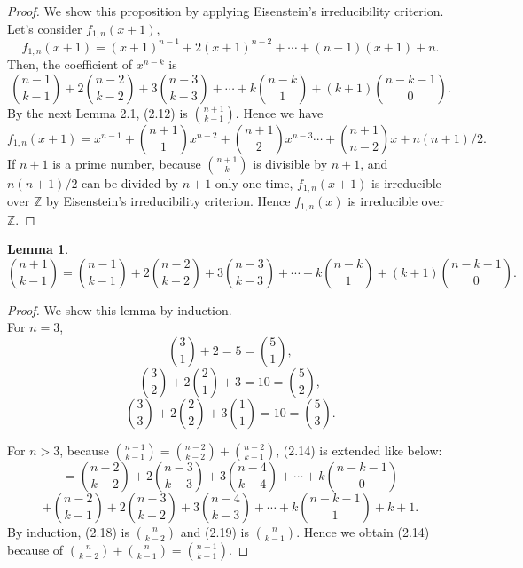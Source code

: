\documentclass{article}
\newtheorem{lemm}{Lemma}[section]
\begin{document}
\begin{proof}
We show this proposition by applying Eisenstein's irreducibility criterion. Let's consider $f_{1,n}(x+1)$,
\begin{equation}
f_{1,n}(x+1)=(x+1)^{n-1}+2(x+1)^{n-2}+\cdots +(n-1)(x+1)+n.
\end{equation}
Then, the coefficient of $x^{n-k}$ is
\begin{equation}
\binom{n-1}{k-1}+2\binom{n-2}{k-2}+3\binom{n-3}{k-3}+\cdots +k\binom{n-k}{1}+(k+1)\binom{n-k-1}{0}.
\end{equation}
By the next Lemma 2.1, (2.12) is $\binom{n+1}{k-1}$.  Hence we have
\begin{equation}
f_{1,n}(x+1)=x^{n-1}+\binom{n+1}{1}x^{n-2}+\binom{n+1}{2}x^{n-3}\cdots +\binom{n+1}{n-2}x+n(n+1)/2.
\end{equation}
If $n+1$ is a prime number, because $\binom{n+1}{k}$ is divisible by $n+1$, and $n(n+1)/2$ can be divided by $n+1$ only one time, $f_{1,n}(x+1)$ is irreducible over $\mathbb{Z}$ by Eisenstein's irreducibility criterion. Hence $f_{1,n}(x)$ is irreducible over $\mathbb{Z}$.
\end{proof}


\begin{lemm}
\upshape
\begin{equation}
\binom{n+1}{k-1}=\binom{n-1}{k-1}+2\binom{n-2}{k-2}+3\binom{n-3}{k-3}+\cdots +k\binom{n-k}{1}+(k+1)\binom{n-k-1}{0}.
\end{equation}
\end{lemm}

\begin{proof}
We show this lemma by induction. 
\\

For $n=3$,
\begin{equation}
\binom{3}{1}+2=5=\binom{5}{1},
\end{equation}
\begin{equation}
\binom{3}{2}+2\binom{2}{1}+3=10=\binom{5}{2},
\end{equation}
\begin{equation}
\binom{3}{3}+2\binom{2}{2}+3\binom{1}{1}=10=\binom{5}{3}.
\end{equation}

For $n>3$, because $\binom{n-1}{k-1}=\binom{n-2}{k-2}+\binom{n-2}{k-1}$, (2.14) is extended like below:
\begin{equation}
=\binom{n-2}{k-2}+2\binom{n-3}{k-3}+3\binom{n-4}{k-4}+\cdots +k\binom{n-k-1}{0}
\end{equation}
\begin{equation}
+\binom{n-2}{k-1}+2\binom{n-3}{k-2}+3\binom{n-4}{k-3}+\cdots +k\binom{n-k-1}{1}+k+1.
\end{equation}
By induction, (2.18) is $\binom{n}{k-2}$ and (2.19) is $\binom{n}{k-1}$. Hence we obtain (2.14) because of $\binom{n}{k-2}+\binom{n}{k-1}=\binom{n+1}{k-1}$.

\end{proof}
\end{document}
